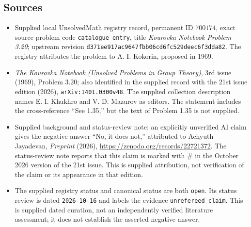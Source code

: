\documentclass[11pt]{article}
\begin{document}
\subsection{Sources}
\begin{itemize}
\item Supplied local UnsolvedMath registry record, permanent ID \(700174\), exact source problem code \texttt{catalogue entry}, title \emph{Kourovka Notebook Problem 3.20}; upstream revision \texttt{d371ee917ac9647fbb06cd6fc529deec6f3dda82}. The registry attributes the problem to A. I. Kokorin, proposed in 1969.
\item \emph{The Kourovka Notebook (Unsolved Problems in Group Theory)}, 3rd issue (1969), Problem 3.20; also identified in the supplied record with the 21st issue edition (2026), \texttt{arXiv:1401.0300v48}. The supplied collection description names E. I. Khukhro and V. D. Mazurov as editors. The statement includes the cross-reference ``See 1.35,'' but the text of Problem 1.35 is not supplied.
\item Supplied background and status-review note: an explicitly unverified AI claim gives the negative answer ``No, it does not,'' attributed to Achyuth Jayadevan, \emph{Preprint} (2026), \url{https://zenodo.org/records/22721372}. The status-review note reports that this claim is marked with \(\#\) in the October 2026 version of the 21st issue. This is supplied attribution, not verification of the claim or its appearance in that edition.
\item The supplied registry status and canonical status are both \texttt{open}. Its status review is dated \texttt{2026-10-16} and labels the evidence \texttt{unrefereed\_claim}. This is supplied dated curation, not an independently verified literature assessment; it does not establish the asserted negative answer.
\end{itemize}
\end{document}
